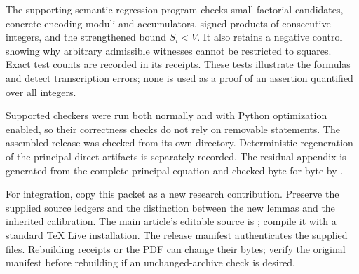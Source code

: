 The supporting semantic regression program checks small factorial candidates,
concrete encoding moduli and accumulators, signed products of consecutive
integers, and the strengthened bound $S_i<V$. It also retains a negative
control showing why arbitrary admissible witnesses cannot be restricted to
squares. Exact test counts are recorded in its receipts.
These tests illustrate the formulas and detect transcription errors;
none is used as a proof of an assertion quantified over all integers.

Supported checkers were run both normally and with Python optimization
enabled, so their correctness checks do not rely on removable 
statements. The assembled release was checked from its own directory.
Deterministic regeneration of the principal direct artifacts is separately
recorded. The residual appendix is generated from the complete principal
equation and checked byte-for-byte by
.

For integration, copy this packet as a new research contribution. Preserve the
supplied source ledgers and the distinction between the new lemmas and the
inherited calibration. The main article's editable source is
; compile it with a standard TeX Live installation.
The release manifest authenticates the supplied files. Rebuilding receipts or
the PDF can change their bytes; verify the original manifest before rebuilding
if an unchanged-archive check is desired.
